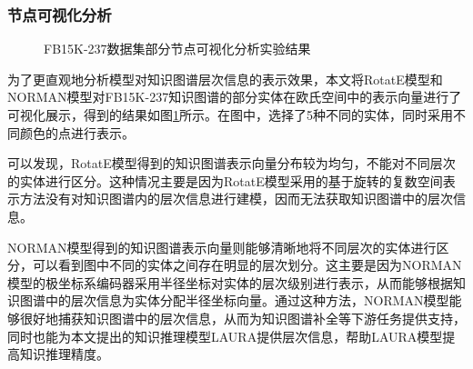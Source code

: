 \documentclass[algorithmlist, AutoFakeBold, AutoFakeSlant, figurelist, tablelist, nomlist, engineering, openany]{seuthesix} %
\begin{document}
\subsubsection{节点可视化分析}
\begin{figure}[t]
  \centering
  \caption{FB15K-237数据集部分节点可视化分析实验结果}
  \label{Experiment1_figures}
\end{figure}

为了更直观地分析模型对知识图谱层次信息的表示效果，本文将RotatE模型和NORMAN模型对FB15K-237知识图谱的部分实体在欧氏空间中的表示向量进行了可视化展示，得到的结果如图\ref{Experiment1_figures}所示。在图中，选择了5种不同的实体，同时采用不同颜色的点进行表示。

可以发现，RotatE模型得到的知识图谱表示向量分布较为均匀，不能对不同层次的实体进行区分。这种情况主要是因为RotatE模型采用的基于旋转的复数空间表示方法没有对知识图谱内的层次信息进行建模，因而无法获取知识图谱中的层次信息。

NORMAN模型得到的知识图谱表示向量则能够清晰地将不同层次的实体进行区分，可以看到图中不同的实体之间存在明显的层次划分。这主要是因为NORMAN模型的极坐标系编码器采用半径坐标对实体的层次级别进行表示，从而能够根据知识图谱中的层次信息为实体分配半径坐标向量。通过这种方法，NORMAN模型能够很好地捕获知识图谱中的层次信息，从而为知识图谱补全等下游任务提供支持，同时也能为本文提出的知识推理模型LAURA提供层次信息，帮助LAURA模型提高知识推理精度。
\end{document}
